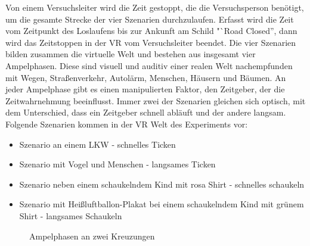 \documentclass{Bericht}
\begin{document}
Von einem Versuchsleiter wird die Zeit gestoppt, die die Versuchsperson benötigt, um die gesamte Strecke der vier Szenarien  durchzulaufen. Erfasst wird die Zeit vom Zeitpunkt des Loslaufens bis zur Ankunft am Schild "`Road Closed'', dann wird das Zeitstoppen in der VR vom Versuchsleiter beendet. Die vier Szenarien bilden zusammen die virtuelle Welt und bestehen aus insgesamt vier Ampelphasen. Diese sind visuell und auditiv einer realen Welt nachempfunden mit Wegen, Straßenverkehr, Autolärm, Menschen, Häusern und Bäumen. An jeder Ampelphase gibt es einen manipulierten Faktor, den Zeitgeber, der die Zeitwahrnehmung beeinflusst. Immer zwei der Szenarien gleichen sich optisch, mit dem Unterschied, dass ein Zeitgeber schnell abläuft und der andere langsam. \\

Folgende Szenarien kommen in der VR Welt des Experiments vor:
\begin{itemize}
	\setlength{\itemsep}{0em}
	\item Szenario an einem LKW - schnelles Ticken
	\item Szenario mit Vogel und Menschen - langsames Ticken
	\item Szenario neben einem schaukelndem Kind mit rosa Shirt - schnelles schaukeln
	\item Szenario mit Heißluftballon-Plakat bei einem schaukelndem Kind mit grünem Shirt - langsames Schaukeln
\end{itemize}

\begin{figure}[H]
	\caption{Ampelphasen an zwei Kreuzungen}
	\label{img:ampelphasen-1}
\end{figure}
\end{document}
